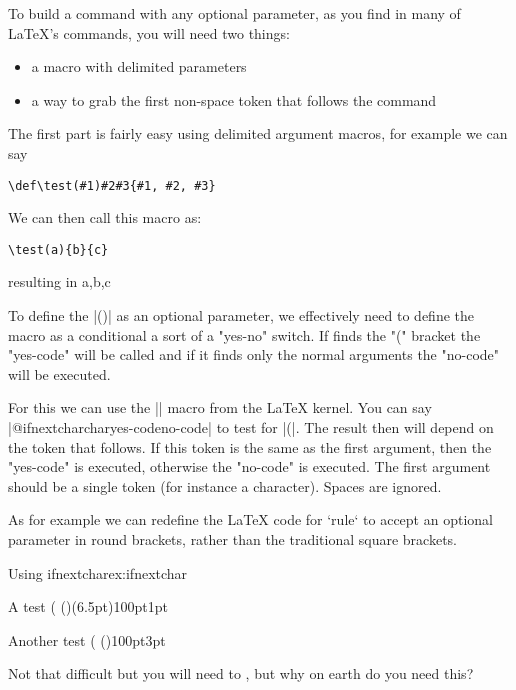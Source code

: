 To build a command with any optional parameter, as you find in many of LaTeX's commands, you will need two things:

\begin{itemize}
\item a macro with delimited parameters

\item a way to grab the first non-space token that follows the command
\end{itemize}


The first part is fairly easy using delimited argument macros, for example we can say

\begin{verbatim}
\def\test(#1)#2#3{#1, #2, #3}
\end{verbatim}

We can then call this macro as:

\begin{verbatim}
\test(a){b}{c}
\end{verbatim}


resulting in a,b,c

To define the |()| as an optional parameter, we effectively need to define the macro as a conditional a sort of a "yes-no" switch. If \tex finds the "(" bracket the "yes-code" will be called and if it finds only the normal arguments the "no-code" will be executed.

For this we can use the |\@ifnextchar| macro from the LaTeX kernel.
You can say |@ifnextchar{char}{yes-code}{no-code}| to test for |(|. The result then will depend on the token that follows. If this token is the same as the first argument, then the "yes-code" is executed, otherwise the "no-code" is executed. The first argument should be a single token (for instance a character). Spaces are ignored. 

As for example we can redefine the LaTeX code for `rule` to accept an optional parameter in round brackets, rather than the traditional square brackets.

\begin{texexample}{Using ifnextchar}{ex:ifnextchar}
\makeatletter
\def\Rule{\@ifnextchar(\@Rule%
        {\@Rule(\z@)}}
\def\@Rule(#1)#2#3{%
 \leavevmode
 \hbox{%
 \setlength\@tempdima{#1}%
 \setlength\@tempdimb{#2}%
 \setlength\@tempdimc{#3}%
 \advance\@tempdimc\@tempdima
 \vrule\@width\@tempdimb\@height\@tempdimc\@depth-\@tempdima}}
\makeatother

A test \Rule(6.5pt){100pt}{1pt}

Another test \Rule{100pt}{3pt}

Not that difficult but you will need to , but why on earth do you need this?
\end{texexample}




